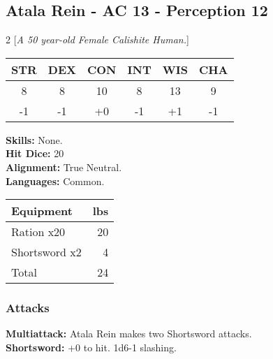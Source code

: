 \subsection*{Atala Rein - AC 13 - Perception 12}
\begin{multicols}{2}
[\textit{A 50 year-old Female Calishite Human.}]
\begin{tabular}{cccccc}
 {STR}&
 {DEX}&
 {CON}&
 {INT}&
 {WIS}&
 {CHA}\\
\hline
8 & 8 & 10 & 8 & 13 & 9\\
-1 & -1 & +0 & -1 & +1 & -1
\end{tabular}
\textbf{Skills:} 
None.\\
\textbf{Hit Dice:} 20\\
\textbf{Alignment:} True Neutral.\\
\textbf{Languages:} 
Common.\\

\begin{tabular}{p{} r}
\textbf{Equipment} & lbs\\
\hline

Ration x20 & 20\\

Shortsword x2 & 4\\

\hline
Total & 24
\end{tabular}


\end{multicols}
\subsubsection*{Attacks}
\textbf{Multiattack:} Atala Rein makes two Shortsword attacks.\\\textbf{Shortsword:} +0 to hit. 1d6-1 slashing.\\
